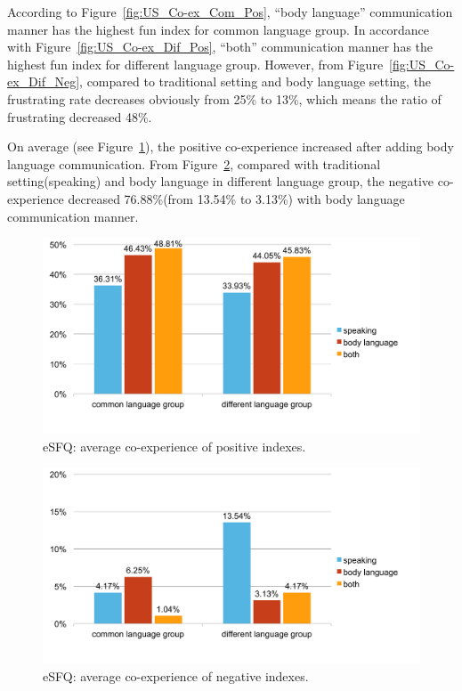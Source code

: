 
According to Figure~\ref{fig:US_Co-ex_Com_Pos}, ``body language'' communication manner has the highest fun index for common language group. In accordance with Figure~\ref{fig:US_Co-ex_Dif_Pos}, ``both'' communication manner has the highest fun index for different language group. However, from Figure~\ref{fig:US_Co-ex_Dif_Neg}, compared to traditional setting and body language setting, the frustrating rate decreases obviously from 25\% to 13\%, which means the ratio of frustrating decreased 48\%.

On average (see Figure~\ref{fig:US_eSFQ_Pos_Average}), the positive co-experience increased after adding body language communication. From Figure~\ref{fig:US_eSFQ_Neg_Average}, compared with traditional setting(speaking) and body language in different language group, the negative co-experience decreased 76.88\%(from 13.54\% to 3.13\%) with body language communication manner.


\begin{figure}[!h]
\centering
\includegraphics[width=0.8\columnwidth]{Figures/US_eSFQ_Pos_Average.pdf}
\caption{eSFQ: average co-experience of positive indexes.}
\label{fig:US_eSFQ_Pos_Average}
\end{figure}

\begin{figure}[!h]
\centering
\includegraphics[width=0.8\columnwidth]{Figures/US_eSFQ_Neg_Average.pdf}
\caption{eSFQ: average co-experience of negative indexes.}
\label{fig:US_eSFQ_Neg_Average}
\end{figure}

